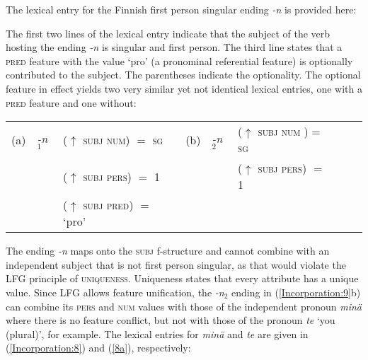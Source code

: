 \documentclass[output=paper,hidelinks]{langscibook}
\begin{document}
   The     lexical entry for the Finnish first  person  singular ending \textit{-n} is  provided  here: 
 
 \ea \label{8aa} 
 \z
The first two  lines of the lexical entry indicate  that the subject of  the verb  hosting the ending \textit{-n}   is  singular and first person.  The third line  states that a \textsc{pred}  feature with the value `pro'  (a pronominal  referential feature)   is  optionally contributed to the subject.    The parentheses indicate the optionality.    The optional feature in effect yields two very similar yet not identical lexical entries,  one with a \textsc{pred} feature and one without:

 \ea\label{Incorporation:9}\begin{tabular}[t]{llllll ll} 
  (a) & \textit{-n}$_1$
      &  ($\uparrow$ \textsc{subj  num}) $=$   \textsc{sg}
      &
  (b) &  \textit{-n}$_2$
      &  ($\uparrow$  \textsc{subj  num} )$=$   \textsc{sg} \\
 &    & ($\uparrow$  \textsc{subj  pers}) $=$ 1    
      &
      &
      &  ($\uparrow$ \textsc{subj  pers}) $=$ 1   \\
 &    & ($\uparrow$  \textsc{subj  pred}) $=$  `pro'
      & \hspace{.1in}  &
      &
      &   \end{tabular}
\z 
The  ending  \textit{-n} maps  onto the \textsc{subj} f-structure  and  cannot  combine  with  an  independent  subject that is not first  person  singular, as  that  would  violate  the LFG principle of \textsc{uniqueness}.  Uniqueness states  that  every attribute  has a  unique value. Since  LFG allows feature unification, the \textit{-n$_2$} ending in (\ref{Incorporation:9}b) can combine its  \textsc{pers} and \textsc{num}    values  with  those of the independent pronoun \textit{min\"{a}} where there is  no  feature  conflict, but not  with those of the pronoun \textit{te} `you (plural)',  for example.  The lexical entries for  \textit{min\"{a}} and \textit{te}  are  given  in (\ref{Incorporation:8}) and  (\ref{8a}),  respectively: 
\end{document}
